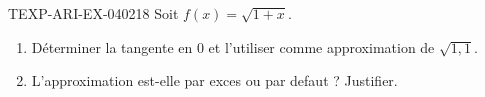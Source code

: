 \begin{exercice}{TEXP-ARI-EX-040}{2}{18}
Soit $f(x) = \sqrt{1+x}$.
\begin{enumerate}
  \item Déterminer la tangente en $0$ et l'utiliser comme approximation de $\sqrt{1{,}1}$.
  \item L'approximation est-elle par exces ou par defaut ? Justifier.
\end{enumerate}

\end{exercice}
